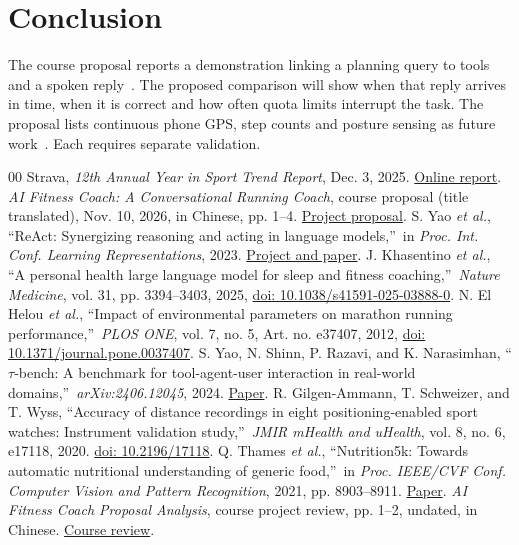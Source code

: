 \documentclass[conference]{IEEEtran}
\begin{document}
\section{Conclusion}
The course proposal reports a demonstration linking a planning query to tools and a spoken reply~\cite[pp.~1, 3--4]{proposal}. The proposed comparison will show when that reply arrives in time, when it is correct and how often quota limits interrupt the task. The proposal lists continuous phone GPS, step counts and posture sensing as future work~\cite[p.~4]{proposal}. Each requires separate validation.

\begin{thebibliography}{00}
 Strava, \emph{12th Annual Year in Sport Trend Report}, Dec. 3, 2025. \href{https://press.strava.com/en-gb/articles/strava-releases-12th-annual-year-in-sport-trend-report-2025}{Online report}.
 \emph{AI Fitness Coach: A Conversational Running Coach}, course proposal (title translated), Nov. 10, 2026, in Chinese, pp. 1--4. \href{https://github.com/HitomiHuang/DIC3-AI-Fitness-Coach/blob/main/myplan/proposal.pdf}{Project proposal}.
 S. Yao \emph{et al.}, \textquotedblleft ReAct: Synergizing reasoning and acting in language models,\textquotedblright\ in \emph{Proc. Int. Conf. Learning Representations}, 2023. \href{https://react-lm.github.io/}{Project and paper}.
 J. Khasentino \emph{et al.}, \textquotedblleft A personal health large language model for sleep and fitness coaching,\textquotedblright\ \emph{Nature Medicine}, vol. 31, pp. 3394--3403, 2025, \href{https://doi.org/10.1038/s41591-025-03888-0}{doi: 10.1038/s41591-025-03888-0}.
 N. El Helou \emph{et al.}, \textquotedblleft Impact of environmental parameters on marathon running performance,\textquotedblright\ \emph{PLOS ONE}, vol. 7, no. 5, Art. no. e37407, 2012, \href{https://doi.org/10.1371/journal.pone.0037407}{doi: 10.1371/journal.pone.0037407}.
 S. Yao, N. Shinn, P. Razavi, and K. Narasimhan, \textquotedblleft $\tau$-bench: A benchmark for tool-agent-user interaction in real-world domains,\textquotedblright\ \emph{arXiv:2406.12045}, 2024. \href{https://arxiv.org/abs/2406.12045}{Paper}.
 R. Gilgen-Ammann, T. Schweizer, and T. Wyss, \textquotedblleft Accuracy of distance recordings in eight positioning-enabled sport watches: Instrument validation study,\textquotedblright\ \emph{JMIR mHealth and uHealth}, vol. 8, no. 6, e17118, 2020. \href{https://doi.org/10.2196/17118}{doi: 10.2196/17118}.
 Q. Thames \emph{et al.}, \textquotedblleft Nutrition5k: Towards automatic nutritional understanding of generic food,\textquotedblright\ in \emph{Proc. IEEE/CVF Conf. Computer Vision and Pattern Recognition}, 2021, pp. 8903--8911. \href{https://openaccess.thecvf.com/content/CVPR2021/html/Thames_Nutrition5k_Towards_Automatic_Nutritional_Understanding_of_Generic_Food_CVPR_2021_paper.html}{Paper}.
 \emph{AI Fitness Coach Proposal Analysis}, course project review, pp. 1--2, undated, in Chinese. \href{https://github.com/HitomiHuang/DIC3-AI-Fitness-Coach/blob/main/myplan/proposal-analysis.pdf}{Course review}.
\end{thebibliography}
\end{document}
